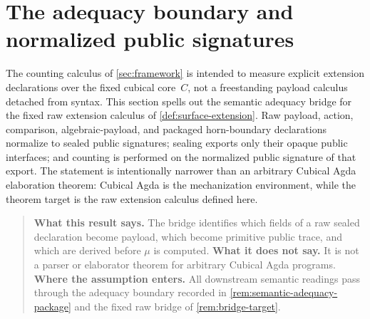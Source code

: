 \documentclass{lmcs}
\begin{document}
\section{The adequacy boundary and normalized public signatures}
\label{sec:bridge}

The counting calculus of \autoref{sec:framework} is intended to measure explicit extension declarations over the fixed cubical core~$C$, not a freestanding payload calculus detached from syntax. This section spells out the semantic adequacy bridge for the fixed raw extension calculus of \autoref{def:surface-extension}. Raw payload, action, comparison, algebraic-payload, and packaged horn-boundary declarations normalize to sealed public signatures; sealing exports only their opaque public interfaces; and counting is performed on the normalized public signature of that export. The statement is intentionally narrower than an arbitrary Cubical Agda elaboration theorem: Cubical Agda is the mechanization environment, while the theorem target is the raw extension calculus defined here.

\begin{quote}
\small
\textbf{What this result says.}
The bridge identifies which fields of a raw sealed declaration become payload,
which become primitive public trace, and which are derived before $\mu$ is
computed.
\textbf{What it does not say.}
It is not a parser or elaborator theorem for arbitrary Cubical Agda programs.
\textbf{Where the assumption enters.}
All downstream semantic readings pass through the adequacy boundary recorded in
\autoref{rem:semantic-adequacy-package} and the fixed raw bridge of
\autoref{rem:bridge-target}.
\end{quote}
\end{document}
